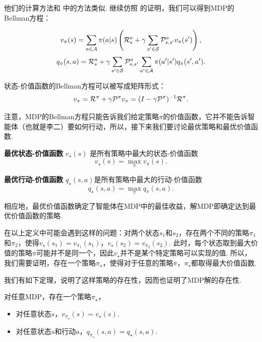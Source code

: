 他们的计算方法和 中的方法类似. 继续仿照 的证明，我们可以得到MDP的Bellman方程：

\begin{theorem}[Bellman方程]
\[v_\pi(s) = \sum_{a\in \mathcal A}\pi(a|s)\left(\mathcal R_s^a + \gamma \sum_{s'\in \mathcal S}\mathcal P_{s,s'}^av_\pi(s')\right),\]
\[q_\pi(s,a) = \mathcal R_s^a + \gamma \sum_{s'\in \mathcal S}\mathcal P_{s,s'}^a \sum_{a'\in \mathcal A}\pi(a'|s')q_\pi(s',a').\]
\end{theorem}

状态-价值函数的Bellman方程可以被写成矩阵形式：
\[v_\pi = \mathcal R^\pi + \gamma \mathcal P^\pi v_\pi = (I-\gamma \mathcal P^\pi)^{-1}\mathcal R^\pi.\]

注意，MDP的Bellman方程只能告诉我们给定策略$\pi$的价值函数，它并不能告诉智能体（也就是李二）要如何行动，所以，接下来我们要讨论最优策略和最优价值函数. 

\begin{definition}[最优价值函数]
\textbf{最优状态-价值函数} $v_\star(s)$ 是所有策略中最大的状态-价值函数
    \[v_\star(s) = \max_\pi v_\pi(s).\]

\textbf{最优行动-价值函数} $q_\star(s,a)$是所有策略中最大的行动-价值函数
    \[q_\star(s,a) = \max_\pi q_\pi(s,a).\]
\end{definition}

相应地，最优价值函数确定了智能体在MDP中的最佳收益，解MDP即确定达到最优价值函数的策略. 

在以上定义中可能会遇到这样的问题：对两个状态$s_1$和$s_2$，存在两个不同的策略$\pi_1$和$\pi_2$，使得$v_\star(s_1)=v_{\pi_1}(s_1)$，$v_\star(s_2)=v_{\pi_2}(s_2)$. 此时，每个状态取到最大价值的策略$\pi$可能并不是同一个，因此$v_\star$并不是某个特定策略可以实现的值. 所以，我们需要证明，存在一个策略$\pi_\star$，使得对于任意的策略$\pi$，$\pi_\star$都取得最大价值函数. 

我们有如下定理，说明了这样策略的存在性，因而也证明了MDP解的存在性. 
\begin{theorem}[MDP解的存在性]\label{thm:MDP-existence}
对任意MDP，存在一个策略$\pi_\star$，
\begin{itemize}
    \item 对任意状态$s$，$v_{\pi_\star}(s) = v_\star(s)$.
    \item 对任意状态$s$和行动$a$，$q_{\pi_\star}(s,a)=q_\star(s,a)$.
\end{itemize}
\end{theorem}

